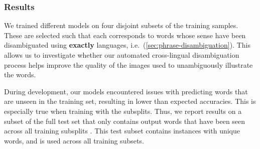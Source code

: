 \documentclass[twocolumn]{svjour3}          \smartqed  \usepackage{graphicx}
\begin{document}
\subsubsection{Results}
\label{sec:gapfilling-results}

We trained different models on four disjoint subsets of the training samples. These are selected such that each corresponds to words whose sense have been disambiguated using \textbf{exactly}  languages, i.e.\  (\ref{sec:phrase-disambiguation}). This allows us to investigate whether our automated cross-lingual  disambiguation process helps improve the quality of the images used to unambiguously illustrate the words.

During development, our models encountered issues with predicting words that are unseen in the training set, resulting in lower than expected accuracies. This is especially true when training with the  subsplits. Thus, we report results on a subset of the full test set that only contains output words that have been seen across all training subsplits  . This test subset contains  instances with  unique words, and is used across all training subsets.
\begin{table}[t]
    \caption{Accuracy and word similarity scores for our baseline (text-only) models on the fill-in-the-blank task, evaluated on the test subset and trained on the full training set.}
    \label{tbl:gapfilling-baseline}
    \centering
\end{table}
\end{document}
